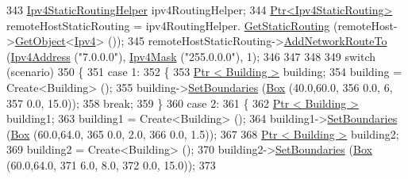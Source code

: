 \begin{DoxyCode}
343         \hyperlink{classns3_1_1Ipv4StaticRoutingHelper}{Ipv4StaticRoutingHelper} ipv4RoutingHelper;
344         \hyperlink{classns3_1_1Ptr}{Ptr<Ipv4StaticRouting>} remoteHostStaticRouting = ipv4RoutingHelper.
      \hyperlink{classns3_1_1Ipv4StaticRoutingHelper_a731206e50d305695dac7fb2ef963a4bb}{GetStaticRouting} (remoteHost->\hyperlink{classns3_1_1Object_a13e18c00017096c8381eb651d5bd0783}{GetObject}<\hyperlink{classns3_1_1Ipv4}{Ipv4}> ());
345         remoteHostStaticRouting->\hyperlink{classns3_1_1Ipv4StaticRouting_a8bf5eaa7ba49fe33c78c70d5560b6c39}{AddNetworkRouteTo} (\hyperlink{classns3_1_1Ipv4Address}{Ipv4Address} (\textcolor{stringliteral}{"7.0.0.0"}), 
      \hyperlink{classns3_1_1Ipv4Mask}{Ipv4Mask} (\textcolor{stringliteral}{"255.0.0.0"}), 1);
346 
347 
348 
349         \textcolor{keywordflow}{switch} (scenario)
350         \{
351                 \textcolor{keywordflow}{case} 1:
352                 \{
353                         \hyperlink{classns3_1_1Ptr}{Ptr < Building >} building;
354                         building = Create<Building> ();
355                         building->\hyperlink{classns3_1_1Building_a4b69659f05a983f06e33e7db62415915}{SetBoundaries} (\hyperlink{classns3_1_1Box}{Box} (40.0,60.0,
356                                                                                 0.0, 6,
357                                                                                 0.0, 15.0));
358                         \textcolor{keywordflow}{break};
359                 \}
360                 \textcolor{keywordflow}{case} 2:
361                 \{
362                         \hyperlink{classns3_1_1Ptr}{Ptr < Building >} building1;
363                         building1 = Create<Building> ();
364                         building1->\hyperlink{classns3_1_1Building_a4b69659f05a983f06e33e7db62415915}{SetBoundaries} (\hyperlink{classns3_1_1Box}{Box} (60.0,64.0,
365                                                                                 0.0, 2.0,
366                                                                                 0.0, 1.5));
367 
368                         \hyperlink{classns3_1_1Ptr}{Ptr < Building >} building2;
369                         building2 = Create<Building> ();
370                         building2->\hyperlink{classns3_1_1Building_a4b69659f05a983f06e33e7db62415915}{SetBoundaries} (\hyperlink{classns3_1_1Box}{Box} (60.0,64.0,
371                                                                                 6.0, 8.0,
372                                                                                 0.0, 15.0));
373 

\end{DoxyCode}
